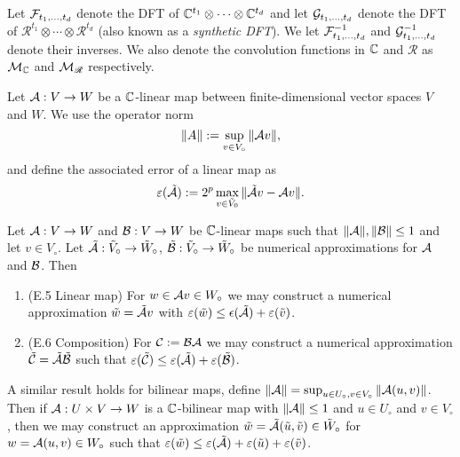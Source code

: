 Let $\mathcal F_{t_1, \ldots, t_d}$ denote the DFT of ${\mathbb C}^{t_1} \otimes \cdots \otimes {\mathbb C}^{t_d}$ and let $\mathcal G_{t_1, \ldots, t_d}$ denote the DFT of $\mathscr{R}^{t_1} \otimes \cdots \otimes \mathscr{R}^{t_d}$ (also known as a \emph{synthetic DFT}).
We let $\mathcal F^{-1}_{t_1, \ldots, t_d}$ and $\mathcal G_{t_1, \ldots, t_d}^{-1}$ denote their inverses.
We also denote the convolution functions in ${\mathbb C}$ and $\mathscr{R}$ as $\mathcal M_{\mathbb C}$ and $\mathcal M_\mathscr{R}$ respectively.

Let $\mathcal A: V \to W$ be a ${\mathbb C}$-linear map between finite-dimensional vector spaces $V$ and $W$. We use the operator norm
\[
    \|A\| := \sup_{v \in V_\circ} \|\mathcal Av\|,
\]
and define the associated error of a linear map as
\[
    \varepsilon(\tilde{\mathcal A}) := 2^p \max_{v \in \tilde{V}_0} \|\tilde{\mathcal A}v - \mathcal Av\|.
\]
\begin{proposition}
    Let $\mathcal A: V \to W$ and $\mathcal B: V \to W$ be ${\mathbb C}$-linear maps such that $\|\mathcal A\|, \|\mathcal B\| \le 1$ and let $v \in V_\circ$. Let $\tilde{\mathcal A}: \tilde{V}_\circ \to \tilde{W}_\circ$, $\tilde{\mathcal B}: \tilde{V}_\circ \to \tilde{W}_\circ$ be numerical approximations for $\mathcal A$ and $\mathcal B$. Then

    \begin{enumerate}
        \item (E.5 Linear map) For $w \in \mathcal Av \in W_\circ$ we may construct a numerical approximation $\tilde{w} = \tilde{\mathcal A}v$ with $\varepsilon(\tilde{w}) \le \epsilon(\tilde{\mathcal A}) + \varepsilon(\tilde{v})$.
        \item (E.6 Composition) For $\mathcal C := \mathcal B\mathcal A$ we may construct a numerical approximation $\tilde{\mathcal C} = \tilde{\mathcal A}\tilde{\mathcal B}$ such that $\varepsilon(\tilde{\mathcal C}) \le \varepsilon(\tilde{\mathcal A}) + \varepsilon(\tilde{\mathcal B})$.
    \end{enumerate}
\end{proposition}

\begin{lemma}\label{lem:err-bilinear-map}
    A similar result holds for bilinear maps, define $\|\mathcal A\| = \sup_{u \in U_\circ, v \in V_\circ} \|\mathcal A(u, v)\|$.
    Then if $\mathcal A: U \times V \to W$ is a ${\mathbb C}$-bilinear map with $\|\mathcal A\| \le 1$ and $u \in U_\circ$ and $v \in V_\circ$, then we may construct an approximation $\tilde{w} = \tilde{\mathcal A}(\tilde{u}, \tilde{v}) \in \tilde{W}_\circ$ for $w = \mathcal A(u, v) \in W_\circ$ such that $\varepsilon(\tilde{w}) \le \varepsilon(\tilde{\mathcal A}) + \varepsilon(\tilde{u}) + \varepsilon(\tilde{v})$.
\end{lemma}


